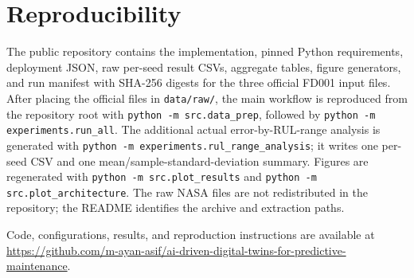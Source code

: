 ﻿\documentclass[conference]{IEEEtran}
\begin{document}
\section*{Reproducibility}
The public repository contains the implementation, pinned Python requirements, deployment JSON, raw per-seed result CSVs, aggregate tables, figure generators, and run manifest with SHA-256 digests for the three official FD001 input files. After placing the official files in \texttt{data/raw/}, the main workflow is reproduced from the repository root with \texttt{python -m src.data\_prep}, followed by \texttt{python -m experiments.run\_all}. The additional actual error-by-RUL-range analysis is generated with \texttt{python -m experiments.rul\_range\_analysis}; it writes one per-seed CSV and one mean/sample-standard-deviation summary. Figures are regenerated with \texttt{python -m src.plot\_results} and \texttt{python -m src.plot\_architecture}. The raw NASA files are not redistributed in the repository; the README identifies the archive and extraction paths.

Code, configurations, results, and reproduction instructions are available at \url{https://github.com/m-ayan-asif/ai-driven-digital-twins-for-predictive-maintenance}.
\end{document}
